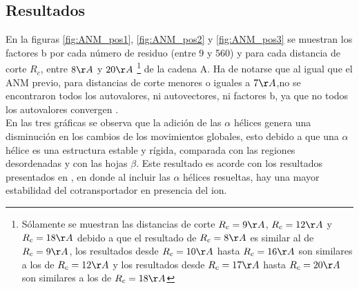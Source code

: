 \subsection{Resultados}
En la figuras%
\ref{fig:ANM_pos1}, \ref{fig:ANM_pos2} y \ref{fig:ANM_pos3} %
se muestran los factores b por cada n\'{u}mero de residuo (entre 9 y 560) y para cada distancia de corte $R_c$, entre $8\AA$ y $20\AA$ \footnote{S\'{o}lamente se muestran las distancias de corte $R_c=9\AA$, $R_c=12\AA$ y $R_c=18\AA$ debido a que el resultado de $R_c=8\AA$ es similar al de $R_c=9\AA$, los resultados desde $R_c=10\AA$ hasta $R_c=16\AA$ son similares a los de $R_c=12\AA$ y los resultados desde $R_c=17\AA$ hasta $R_c=20\AA$ son similares a los de $R_c=18\AA$} de la cadena A. Ha de notarse que al igual que el ANM previo, para distancias de corte menores o iguales a $7\AA$,no se encontraron todos  los autovalores, ni autovectores, ni factores b, ya que no todos los autovalores convergen \cite{Zimmermann2011}.\\

En las tres gr\'{a}ficas se observa que la adici\'{o}n de las $\alpha$ h\'{e}lices genera una disminuci\'{o}n en los cambios de los movimientos globales, esto debido a que una $\alpha$ h\'{e}lice es una estructura estable y r\'{i}gida, comparada con las regiones desordenadas y con las hojas $\beta$. Este resultado es acorde con los resultados presentados en \cite{Adelman2016}, en donde al incluir las $\alpha$ h\'{e}lices resueltas, hay una mayor estabilidad del cotransportador en presencia del ion.\\

